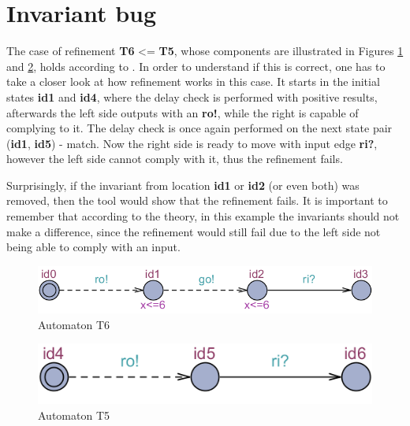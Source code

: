 \section{Invariant bug}\label{sec:case1}
The case of refinement \textbf{T6} <= \textbf{T5}, whose components are illustrated in Figures \ref{fig:T6} and \ref{fig:T5}, holds according to . In order to understand if this is correct, one has to take a closer look at how refinement works in this case. It starts in the initial states \textbf{id1} and \textbf{id4}, where the delay check is performed with positive results, afterwards the left side outputs with an \textbf{ro!}, while the right is capable of complying to it. The delay check is once again performed on the next state pair (\textbf{id1}, \textbf{id5}) - match. Now the right side is ready to move with input edge \textbf{ri?}, however the left side cannot comply with it, thus the refinement fails.

Surprisingly, if the invariant from location \textbf{id1} or \textbf{id2} (or even both) was removed, then the tool would show that the refinement fails. It is important to remember that according to the theory, in this example the invariants should not make a difference, since the refinement would still fail due to the left side not being able to comply with an input.
\begin{figure}
    \centering
    \includegraphics[scale = 0.7]{figures/T6.png}
    \caption{Automaton T6}
    \label{fig:T6}
\end{figure}
\begin{figure}
    \centering
    \includegraphics[scale = 0.7]{figures/T5.png}
    \caption{Automaton T5}
    \label{fig:T5}
\end{figure}
